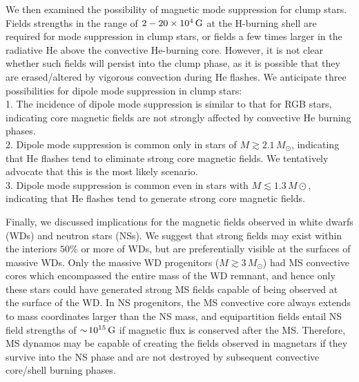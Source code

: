 We then examined the possibility of magnetic mode suppression for clump stars. Fields strengths in the range of $2-20 \times 10^4 \, {\rm G}$ at the H-burning shell are required for mode suppression in clump stars, or fields a few times larger in the radiative He above the convective He-burning core. However, it is not clear whether such fields will persist into the clump phase, as it is possible that they are erased/altered by vigorous convection during He flashes. We anticipate three possibilities for dipole mode suppression in clump stars:\\
1. The incidence of dipole mode suppression is similar to that for RGB stars, indicating core magnetic fields are not strongly affected by convective He burning phases. \\
2. Dipole mode suppression is common only in stars of $M \gtrsim 2.1 \, M_\odot$, indicating that He flashes tend to eliminate strong core magnetic fields. We tentatively advocate that this is the most likely scenario. \\
3. Dipole mode suppression is common even in stars with $M \lesssim 1.3 \, M\odot$, indicating that He flashes tend to generate strong core magnetic fields.



Finally, we discussed implications for the magnetic fields observed in white dwarfs (WDs) and neutron stars (NSs). We suggest that strong fields may exist within the interiors $50 \%$ or more of WDs, but are preferentially visible at the surfaces of massive WDs. Only the massive WD progenitors ($M \gtrsim 3 \, M_\odot$) had MS convective cores which encompassed the entire mass of the WD remnant, and hence only these stars could have generated strong MS fields capable of being observed at the surface of the WD. In NS progenitors, the MS convective core always extends to mass coordinates larger than the NS mass, and equipartition fields entail NS field strengths of $\sim \! 10^{15} \, {\rm G}$ if magnetic flux is conserved after the MS. Therefore, MS dynamos may be capable of creating the fields observed in magnetars if they survive into the NS phase and are not destroyed by subsequent convective core/shell burning phases. 
  
  
  
  
  
  
  
  
  
  
  